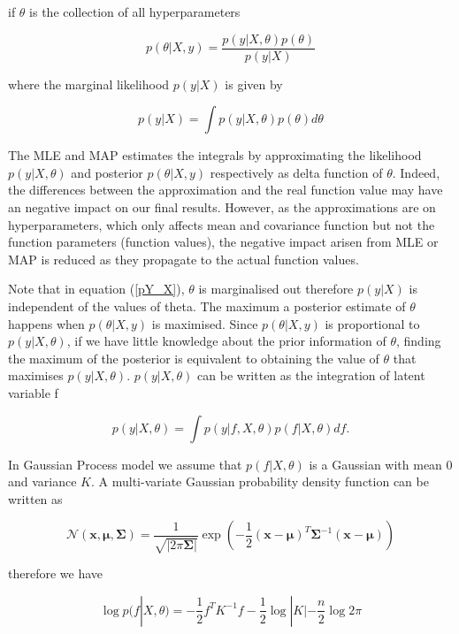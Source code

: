 \documentclass[11pt]{report}
\numberwithin{equation}{chapter}
\begin{document}
\begin{spacing}{2}
if $\theta$ is the collection of all hyperparameters

\[p(\theta|X,y) = \frac{p(y|X,\theta)p(\theta)}{p(y|X)}\]

where the marginal likelihood $p(y|X)$ is given by 

\begin{equation}
\label{pY_X}
p(y|X) = \int{p(y|X,\theta)p(\theta)}d\theta
\end{equation}

The MLE and MAP estimates the integrals by approximating the likelihood $p(y|X,\theta)$ and posterior $p(\theta|X,y)$ respectively as delta function of $\theta$. Indeed, the differences between the approximation and the real function value may have an negative impact on our final results. However, as the approximations are on hyperparameters, which only affects mean and covariance function but not the function parameters (function values), the negative impact arisen from MLE or MAP is reduced as they propagate to the actual function values.

Note that in equation (\ref{pY_X}), $\theta$ is marginalised out therefore $p(y|X)$ is independent of the values of theta. The maximum a posterior estimate of $\theta$ happens when $p(\theta|X,y)$ is maximised. Since $p(\theta|X,y)$ is proportional to $p(y|X,\theta)$, if we have little knowledge about the prior information of $\theta$, finding the maximum of the posterior is equivalent to obtaining the value of $\theta$ that maximises $p(y|X,\theta)$. $p(y|X,\theta)$ can be written as the integration of latent variable f

\begin{equation}
\label{theta_likelihood}
p(y|X,\theta) = \int{p(y|f,X,\theta)p(f|X,\theta)}df.
\end{equation}

In Gaussian Process model we assume that $p(f|X,\theta)$ is a Gaussian with mean 0 and variance $K$. A multi-variate Gaussian probability density function can be written as 

\[\mathcal{N}(\mathbf{x},\mathbf{\mu},\mathbf{\Sigma}) = \frac{1}{\sqrt{|2\pi\mathbf{\Sigma}|}}\operatorname{exp}\left(-\frac{1}{2}(\mathbf{x} - \mathbf{\mu})^T\mathbf{\Sigma}^{-1}(\mathbf{x} - \mathbf{\mu})\right)\]

therefore we have

\begin{equation}
\label{f_posterior}
\operatorname{log}p(f|X,\theta) = -\frac{1}{2}f^TK^{-1}f-\frac{1}{2}\operatorname{log}|K| - \frac{n}{2}\operatorname{log}2\pi
\end{equation}


\end{spacing}
\end{document}

